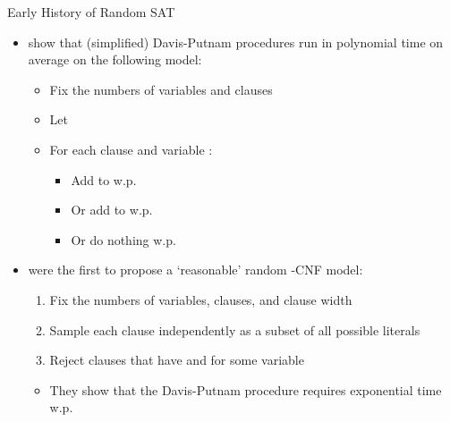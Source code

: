 \documentclass{beamer}
\begin{document}
\begin{frame}{Early History of Random SAT}
  \begin{itemize}
    \item \textcolor{gray}{\textcite{DBLP:journals/ipl/GoldbergPB82}} show that
          (simplified) \alert{Davis-Putnam procedures} run in \alert{polynomial
          time} on average on the following model:
          \begin{itemize}
            \item Fix the numbers of \alert{variables} and \alert{clauses}
            \item Let 
            \item For each clause  and variable :
            \begin{itemize}
              \item \alert{Add}  to  w.p.\
              \item Or \alert{add}  to  w.p.\
              \item Or \alert{do nothing} w.p.\ \structure{$1 - 2p$}
            \end{itemize}
          \end{itemize}
          \pause
    \item \textcolor{gray}{\textcite{DBLP:journals/dam/FrancoP83}} were the
          first to propose a `reasonable' random -CNF model:
    \begin{enumerate}
      \item Fix the numbers of \alert{variables}, \alert{clauses}, and
            \alert{clause width}
      \item \alert{Sample each clause} independently as a subset of all possible
            literals
      \item \alert{Reject} clauses that have \structure{$x$} and
             for some variable 
    \end{enumerate}
    \begin{itemize}
      \item They show that the Davis-Putnam procedure \alert{requires
            exponential time} w.p.\ 
    \end{itemize}
  \end{itemize}
\end{frame}
\end{document}
